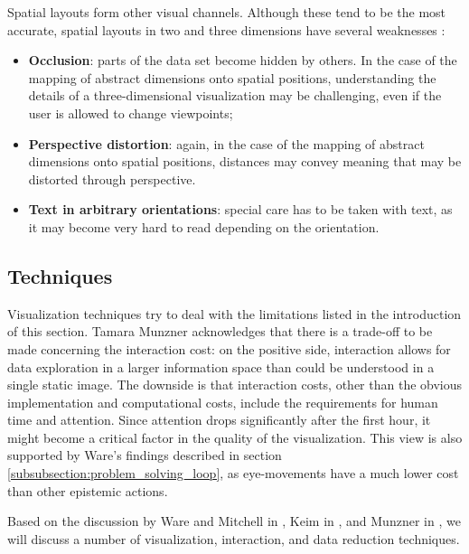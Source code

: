 Spatial layouts form other visual channels. Although these tend to be the most accurate, spatial layouts in two and three dimensions have several weaknesses \cite{shirley:2009}:

\begin{itemize}
	\item \textbf{Occlusion}: parts of the data set become hidden by others. In the case of the mapping of abstract dimensions onto spatial positions, understanding the details of a three-dimensional visualization may be challenging, even if the user is allowed to change viewpoints;
	\item \textbf{Perspective distortion}: again, in the case of the mapping of abstract dimensions onto spatial positions, distances may convey meaning that may be distorted through perspective.
	\item \textbf{Text in arbitrary orientations}: special care has to be taken with text, as it may become very hard to read depending on the orientation.
\end{itemize}


\subsection{Techniques}\label{chapter:literature_study:section:interaction:subsection:techniques}

Visualization techniques try to deal with the limitations listed in the introduction of this section. Tamara Munzner \cite{shirley:2009} acknowledges that there is a trade-off to be made concerning the interaction cost: on the positive side, interaction allows for data exploration in a larger information space than could be understood in a single static image. The downside is that interaction costs, other than the obvious implementation and computational costs, include the requirements for human time and attention\cite{shirley:2009}. Since attention drops significantly after the first hour\cite{ware:2004}, it might become a critical factor in the quality of the visualization. This view is also supported by Ware's findings described in section \ref{subsubsection:problem_solving_loop}, as eye-movements have a much lower cost than other epistemic actions\cite{ware:2004, ware:2008}.

Based on the discussion by Ware and Mitchell in \cite{ware:2004}, Keim in \cite{keim:2002}, and Munzner in \cite{shirley:2009}, we will discuss a number of visualization, interaction, and data reduction techniques.

